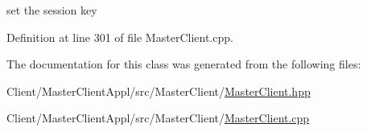 set the session key 



Definition at line 301 of file Master\+Client.\+cpp.



The documentation for this class was generated from the following files\+:\begin{DoxyCompactItemize}
\item 
Client/\+Master\+Client\+Appl/src/\+Master\+Client/\hyperlink{_master_client_8hpp}{Master\+Client.\+hpp}\item 
Client/\+Master\+Client\+Appl/src/\+Master\+Client/\hyperlink{_master_client_8cpp}{Master\+Client.\+cpp}\end{DoxyCompactItemize}
